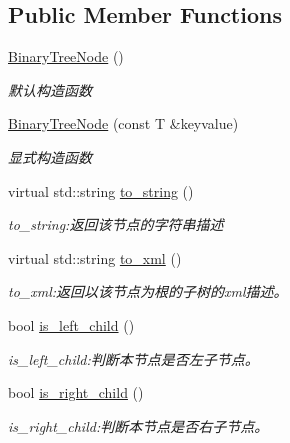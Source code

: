 \subsection*{Public Member Functions}
\begin{DoxyCompactItemize}
\item 
\hyperlink{struct_introdunction_to_algorithm_1_1_tree_algorithm_1_1_binary_tree_node_a6fbeeee0c4db4b2afd3398ca5379b390}{Binary\+Tree\+Node} ()
\begin{DoxyCompactList}\small\item\em 默认构造函数 \end{DoxyCompactList}\item 
\hyperlink{struct_introdunction_to_algorithm_1_1_tree_algorithm_1_1_binary_tree_node_a511c3ca309c8e77045d360ddbba60455}{Binary\+Tree\+Node} (const T \&keyvalue)
\begin{DoxyCompactList}\small\item\em 显式构造函数 \end{DoxyCompactList}\item 
virtual std\+::string \hyperlink{struct_introdunction_to_algorithm_1_1_tree_algorithm_1_1_binary_tree_node_a85f633a95e16b767f01d3eb7a3b17997}{to\+\_\+string} ()
\begin{DoxyCompactList}\small\item\em to\+\_\+string\+:返回该节点的字符串描述 \end{DoxyCompactList}\item 
virtual std\+::string \hyperlink{struct_introdunction_to_algorithm_1_1_tree_algorithm_1_1_binary_tree_node_abefbedeac57528fcfa60cfb1728998f7}{to\+\_\+xml} ()
\begin{DoxyCompactList}\small\item\em to\+\_\+xml\+:返回以该节点为根的子树的{\ttfamily xml}描述。 \end{DoxyCompactList}\item 
bool \hyperlink{struct_introdunction_to_algorithm_1_1_tree_algorithm_1_1_binary_tree_node_a117288aa11c36d94e85664d1599c8099}{is\+\_\+left\+\_\+child} ()
\begin{DoxyCompactList}\small\item\em is\+\_\+left\+\_\+child\+:判断本节点是否左子节点。 \end{DoxyCompactList}\item 
bool \hyperlink{struct_introdunction_to_algorithm_1_1_tree_algorithm_1_1_binary_tree_node_a90c90d98b01fd0ee1060e192cd5858ef}{is\+\_\+right\+\_\+child} ()
\begin{DoxyCompactList}\small\item\em is\+\_\+right\+\_\+child\+:判断本节点是否右子节点。 \end{DoxyCompactList}\end{DoxyCompactItemize}
